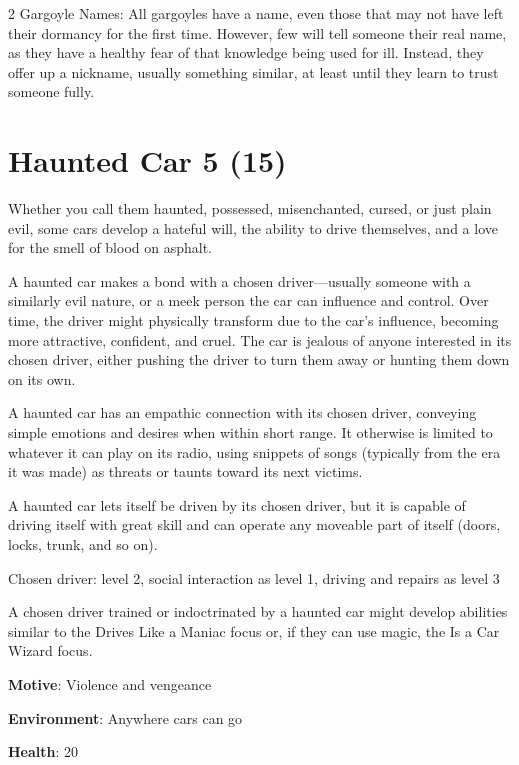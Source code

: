 \begin{multicols}{2}
Gargoyle Names: All gargoyles have a name, even those that may not have left their dormancy for the first time. However, few will tell someone their real name, as they have a healthy fear of that knowledge being used for ill. Instead, they offer up a nickname, usually something similar, at least until they learn to trust someone fully.

\section{Haunted Car 5 (15)}

Whether you call them haunted, possessed, misenchanted, cursed, or just plain evil, some cars develop a hateful will, the ability to drive themselves, and a love for the smell of blood on asphalt. 

A haunted car makes a bond with a chosen driver—usually someone with a similarly evil nature, or a meek person the car can influence and control. Over time, the driver might physically transform due to the car’s influence, becoming more attractive, confident, and cruel. The car is jealous of anyone interested in its chosen driver, either pushing the driver to turn them away or hunting them down on its own. 

A haunted car has an empathic connection with its chosen driver, conveying simple emotions and desires when within short range. It otherwise is limited to whatever it can play on its radio, using snippets of songs (typically from the era it was made) as threats or taunts toward its next victims. 

A haunted car lets itself be driven by its chosen driver, but it is capable of driving itself with great skill and can operate any moveable part of itself (doors, locks, trunk, and so on).

Chosen driver: level 2, social interaction as level 1, driving and repairs as level 3 

A chosen driver trained or indoctrinated by a haunted car might develop abilities similar to the Drives Like a Maniac focus or, if they can use magic, the Is a Car Wizard focus.

\textbf{Motive}: Violence and vengeance 

\textbf{Environment}: Anywhere cars can go 

\textbf{Health}: 20 


\end{multicols}
